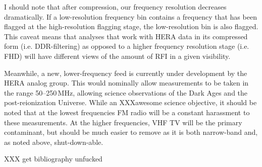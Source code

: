 \documentclass[10pt,a4paper]{article}
\begin{document}
I should note that after compression, our frequency resolution decreases dramatically. If a low-resolution frequency bin contains a frequency that has been flagged at the high-resolution flagging stage, the low-resolution bin is also flagged. This caveat means that analyses that work with HERA data in its compressed form (i.e. DDR-filtering) as opposed to a higher frequency resolution stage (i.e. FHD) will have different views of the amount of RFI in a given visibility. 

Meanwhile, a new, lower-frequency feed is currently under development by the HERA analog group. This would nominally allow measurements to be taken in the range 50--250\,MHz, allowing science observations of the Dark Ages and the post-reionization Universe. While an XXXawesome science objective, it should be noted that at the lowest frequencies FM radio will be a constant harassment to these measurements. At the higher frequencies, VHF TV will be the primary contaminant, but should be much easier to remove as it is both narrow-band and, as noted above, shut-down-able.

XXX get bibliography unfucked



\end{document}
